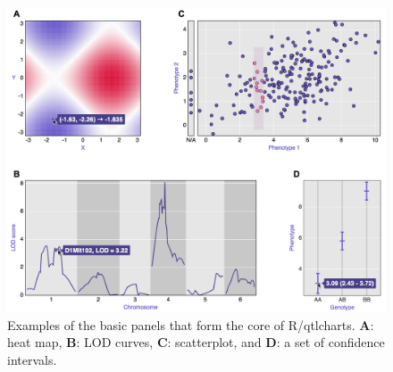 \documentclass[12pt,letterpaper]{article}
\begin{document}
\begin{figure}[!ht]
\begin{center}
\includegraphics[width=\textwidth]{Figs/fig2.png}
\vspace{1cm}
\caption{
Examples of the basic panels that form the core of
R/qtlcharts. \textbf{A}: heat map, \textbf{B}: LOD curves, \textbf{C}:
scatterplot, and \textbf{D}: a set of confidence intervals.\label{fig:panels}
}
\end{center}
\end{figure}
\end{document}
